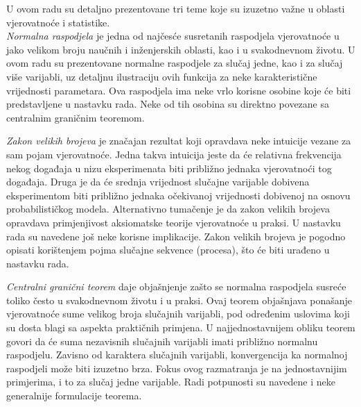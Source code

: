 
\indent
U ovom radu su detaljno prezentovane tri teme koje su izuzetno važne u oblasti
vjerovatnoće i statistike.  \\

\textit{Normalna raspodjela} je jedna od najčesće susretanih raspodjela vjerovatnoće u
jako velikom broju naučnih i inženjerskih oblasti, kao i u svakodnevnom životu.
U ovom radu su prezentovane normalne raspodjele za slučaj jedne, kao i za slučaj
više varijabli, uz detaljnu ilustraciju ovih funkcija za neke karakteristične
vrijednosti parametara. Ova raspodjela ima neke vrlo korisne osobine koje će
biti predstavljene u nastavku rada. Neke od tih osobina su direktno povezane sa
centralnim graničnim teoremom.

\textit{Zakon velikih brojeva} je značajan rezultat koji opravdava neke
intuicije vezane za sam pojam vjerovatnoće. Jedna takva intuicija jeste da će
relativna frekvencija nekog događaja u nizu eksperimenata biti približno jednaka
vjerovatnoći tog događaja. Druga je da će srednja vrijednost slučajne varijable
dobivena eksperimentom biti približno jednaka očekivanoj vrijednosti dobivenoj
na osnovu probabilističkog modela. Alternativno tumačenje je da zakon velikih
brojeva opravdava primjenjivost aksiomatske teorije vjerovatnoće u praksi. U
nastavku rada su navedene još neke korisne implikacije. Zakon velikih brojeva je
pogodno opisati korištenjem pojma slučajne sekvence (procesa), što će biti
urađeno u nastavku rada.

\textit{Centralni granični teorem} daje objašnjenje zašto se normalna raspodjela
susreće toliko često u svakodnevnom životu i u praksi. Ovaj teorem objašnjava
ponašanje vjerovatnoće sume velikog broja slučajnih varijabli, pod određenim
uslovima koji su dosta blagi sa aspekta praktičnih primjena. U najjednostavnijem
obliku teorem govori da će suma nezavisnih slučajnih varijabli imati približno
normalnu raspodjelu.  Zavisno od karaktera slučajnih varijabli, konvergencija ka
normalnoj raspodjeli može biti izuzetno brza. Fokus ovog razmatranja je na
jednostavnijim primjerima, i to za slučaj jedne varijable. Radi potpunosti su
navedene i neke generalnije formulacije teorema. \\
